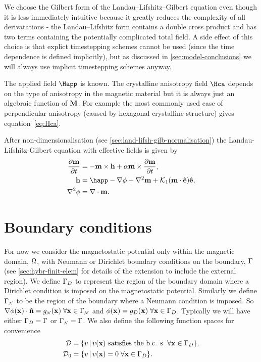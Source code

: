 We choose the Gilbert form of the Landau--Lifshitz--Gilbert equation even though it is less immediately intuitive because it greatly reduces the complexity of all derivatations - the Landau--Lifshitz form contains a double cross product and has two terms containing the potentially complicated total field. A side effect of this choice is that explict timestepping schemes cannot be used (since the time dependence is defined implicitly), but as discussed in \autoref{sec:model-conclusions} we will always use implicit timestepping schemes anyway.

The applied field $\Happ$ is known. The crystalline anisotropy field $\Hca$ depends on the type of anisotropy in the magnetic material but it is always just an algebraic function of $\mathbf{M}$. For example the most commonly used case of perpendicular anisotropy (caused by hexagonal crystalline structure) gives equation~\eqref{eq:Hca}.

After non-dimensionalisation (see \autoref{sec:land-lifsh-gilb-normalisation}) the Landau-Lifshitz-Gilbert equation with effective fields is given by
\begin{equation}
  \begin{aligned}
    \dmdt &= - \mv \times \hv + \alpha \mv \times \dmdt, \\
    \hv &= \happ - \nabla \phim + \lap \mv + \kone (\mv \cdot \ev) \ev, \\
    \lap \phim &= \div \mv.
    \label{eqn:ndllg-starting}
  \end{aligned}
\end{equation}

\section{Boundary conditions}
\label{sec:galerkin-bound-cond}

For now we consider the magnetostatic potential only within the magnetic domain, $\Omega$, with Neumann or Dirichlet boundary conditions on the boundary, ${\Gamma}$ (see \autoref{sec:hybr-finit-elem} for details of the extension to include the external region). We define ${\Gamma}_D$ to represent the region of the boundary domain where a Dirichlet condition is imposed on the magnetostatic potential. Similarly we define ${\Gamma}_{\scriptscriptstyle{\mathcal{N}}}$ to be the region of the boundary where a Neumann condition is imposed. So $ \nabla \phi(\mathbf{x}) \cdot \mathbf{\hat{n}} = g_{\scriptscriptstyle{\mathcal{N}}}(\mathbf{x}) \; \forall \mathbf{x} \in {\Gamma}_{\scriptscriptstyle{\mathcal{N}}}$ and $\phi(\mathbf{x}) = g_D(\mathbf{x}) \; \forall \mathbf{x} \in {\Gamma}_D$. Typically we will have either ${\Gamma}_D = {\Gamma}$ or ${\Gamma}_{\scriptscriptstyle{\mathcal{N}}} = {\Gamma}$. We also define the following function spaces for convenience
\begin{align}
  \label{eq:037}
  \mathcal{D} & = \{ v \,|\, v(\mathbf{x}) \text{ satisfies the b.c. s } \; \forall \mathbf{x} \in {\Gamma}_D \}, \\
  \mathcal{D}_0 &= \{ v \,|\, v(\mathbf{x}) = 0 \; \forall \mathbf{x} \in {\Gamma}_D \}.
\end{align}

